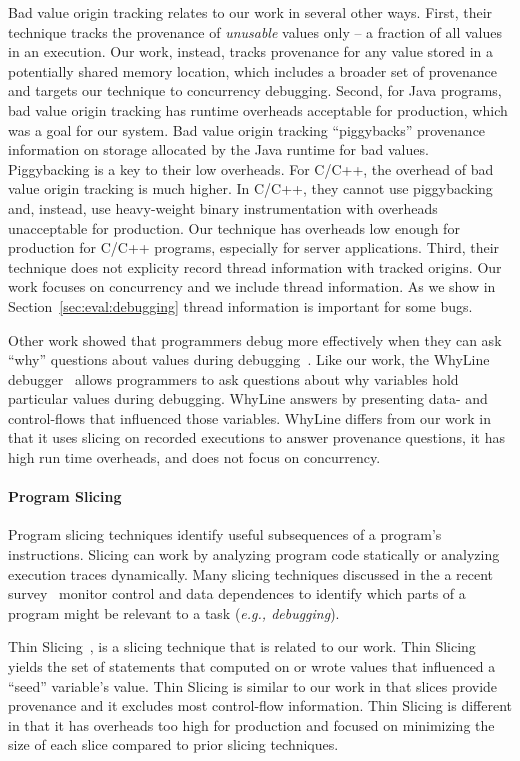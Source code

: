 \documentclass[preprint,10pt]{sigplanconf}
\begin{document}
Bad value origin tracking relates to our work in several other ways.  First,
their technique tracks the provenance of {\em unusable} values only -- a
fraction of all values in an execution.  Our work, instead, tracks provenance
for any value stored in a potentially shared memory location, which includes a
broader set of provenance and targets our technique to concurrency debugging.
Second, for Java programs, bad value origin tracking has runtime overheads
acceptable for production, which was a goal for our system.  Bad value origin
tracking ``piggybacks'' provenance information on storage allocated by the Java
runtime for bad values.  Piggybacking is a key to their low overheads.  For
C/C++, the overhead of bad value origin tracking is much higher.  In C/C++,
they cannot use piggybacking and, instead, use heavy-weight binary
instrumentation with overheads unacceptable for production.  Our technique has
overheads low enough for production for C/C++ programs, especially for server
applications.  Third, their technique does not explicity record thread
information with tracked origins.  Our work focuses on concurrency and we
include thread information.  As we show in Section~\ref{sec:eval:debugging}
thread information is important for some bugs.  

Other work showed that programmers debug more effectively when they can ask
``why'' questions about values during
debugging~\cite{tipslicingsurvey,whylineicse}.  Like our work, the WhyLine
debugger~\cite{whylineicse, whylinechi} allows programmers to ask questions
about why variables hold particular values during debugging.  WhyLine answers
by presenting data- and control-flows that influenced those variables.  WhyLine
differs from our work in that it uses slicing on recorded executions to answer
provenance questions, it has high run time overheads, and does not focus on
concurrency.


\paragraph{Program Slicing}
Program slicing techniques identify useful subsequences of a program's
instructions.   Slicing can work by analyzing program code statically or
analyzing execution traces dynamically.  Many slicing techniques discussed in
the a recent survey~\cite{tipslicingsurvey} monitor control and data
dependences to identify which parts of a program might be relevant to a task
({\em e.g., debugging}).

Thin Slicing~\cite{thinslicing}, is a slicing technique that is related to our
work.  Thin Slicing yields the set of statements that computed on or wrote
values that influenced a ``seed'' variable's value.  Thin
Slicing is similar to our work in that slices provide provenance and it excludes most
control-flow information.  Thin Slicing is different in that it has
overheads too high for production and focused on minimizing the size of each
slice compared to prior slicing techniques. 
\end{document}

